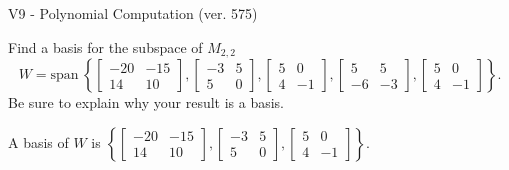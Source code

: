 \begin{exercise}
  \begin{exerciseTitle}V9 - Polynomial Computation (ver. 575)\end{exerciseTitle}
  \begin{exerciseStatement}
    Find a basis for the subspace of \(M_{2,2}\) 
\[W=\mathrm{span}\ \left\{\left[\begin{array}{cc}
-20 & -15 \\
14 & 10
\end{array}\right] , \left[\begin{array}{cc}
-3 & 5 \\
5 & 0
\end{array}\right] , \left[\begin{array}{cc}
5 & 0 \\
4 & -1
\end{array}\right] , \left[\begin{array}{cc}
5 & 5 \\
-6 & -3
\end{array}\right] , \left[\begin{array}{cc}
5 & 0 \\
4 & -1
\end{array}\right]\right\}.\]
 Be sure to explain why your result is a basis.


  \end{exerciseStatement}
  \begin{exerciseAnswer}
   A basis of \(W\) is  \(\left\{\left[\begin{array}{cc}
-20 & -15 \\
14 & 10
\end{array}\right] , \left[\begin{array}{cc}
-3 & 5 \\
5 & 0
\end{array}\right] , \left[\begin{array}{cc}
5 & 0 \\
4 & -1
\end{array}\right]\right\}\).
  


  \end{exerciseAnswer}
\end{exercise}